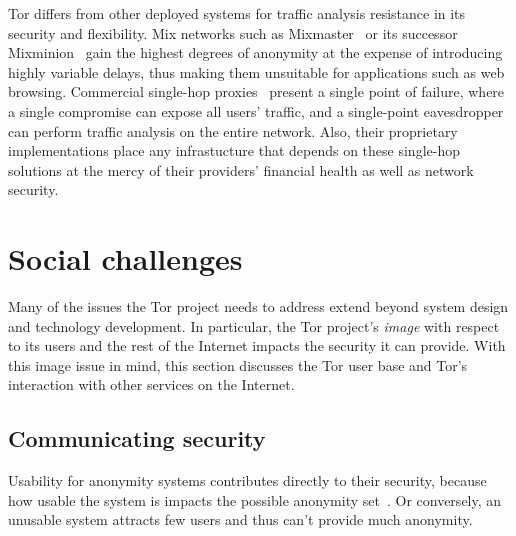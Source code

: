 \documentclass{llncs}
\begin{document}
Tor differs from other deployed systems for traffic analysis resistance
in its security and flexibility.  Mix networks such as
Mixmaster~\cite{mixmaster-spec} or its successor Mixminion~\cite{minion-design}
gain the highest degrees of anonymity at the expense of introducing highly
variable delays, thus making them unsuitable for applications such as web
browsing.  Commercial single-hop
proxies~\cite{anonymizer} present a single point of failure, where
a single compromise can expose all users' traffic, and a single-point
eavesdropper can perform traffic analysis on the entire network.
Also, their proprietary implementations place any infrastucture that
depends on these single-hop solutions at the mercy of their providers'
financial health as well as network security.



\section{Social challenges}

Many of the issues the Tor project needs to address extend beyond
system design and technology development. In particular, the
Tor project's \emph{image} with respect to its users and the rest of
the Internet impacts the security it can provide.
With this image issue in mind, this section discusses the Tor user base and
Tor's interaction with other services on the Internet.

\subsection{Communicating security}

Usability for anonymity systems
contributes directly to their security, because how usable the system
is impacts the possible anonymity set~\cite{econymics,back01}. Or
conversely, an unusable system attracts few users and thus can't provide
much anonymity.
\end{document}
